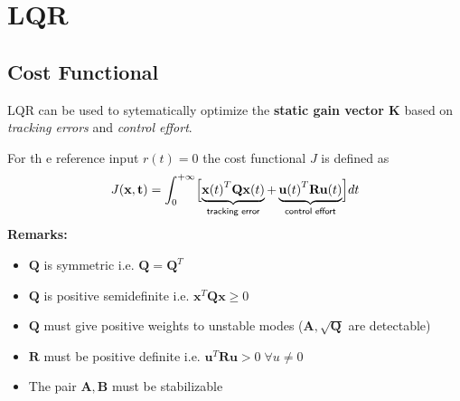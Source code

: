 \section{LQR}
\subsection{Cost Functional}
LQR can be used to sytematically optimize the \textbf{static gain vector K} based on \textit{tracking errors} and \textit{control effort}.

For th   e reference input $r(t) = 0$ the cost functional $J$ is defined as
\noindent\begin{equation*}
    J(\mathbf{x,t})=\int_0^{+\infty} \Bigl[\underbrace{{\mathbf{x}(t)}^T\mathbf{Qx}(t)}_{\textsf{tracking error}} + \underbrace{{\mathbf{u}(t)}^T \mathbf{Ru}(t)}_{\textsf{control effort}} \Bigr]dt
\end{equation*}
\textbf{Remarks:}
\begin{itemize}
    \item $\mathbf{Q}$ is symmetric i.e. $\mathbf{Q}=\mathbf{Q}^T$
    \item $\mathbf{Q}$ is positive semidefinite i.e. $\mathbf{x}^T \mathbf{Qx} \geq 0$
    \item $\mathbf{Q}$ must give positive weights to unstable modes ($\mathbf{A}, \sqrt{\mathbf{Q}}$ are detectable)
    \item $\mathbf{R}$ must be positive definite i.e. $\mathbf{u}^T \mathbf{Ru} >0\; \forall u\neq 0$
    \item The pair $\mathbf{A,B}$ must be stabilizable
\end{itemize}

